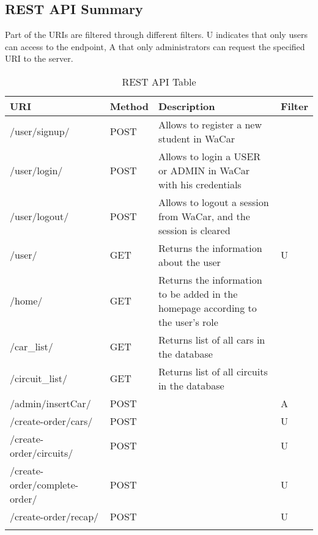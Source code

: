 \subsection{REST API Summary}

Part of the URIs are filtered through different filters. U indicates that only users can access to the endpoint,
A that only administrators can request the specified URI to the server.

\begin{longtable}{|p{}|p{} |p{}|p{}|} 
\hline
\textbf{URI} & \textbf{Method} & \textbf{Description} & \textbf{Filter} \\\hline
/user/signup/  & POST &  Allows to register a new student in WaCar & \\\hline
/user/login/  & POST &  Allows to login a USER or ADMIN in WaCar with his credentials & \\\hline
/user/logout/  & POST &  Allows to logout a session from WaCar, and the session is cleared & \\\hline
/user/ & GET &  Returns the information about the user & U \\\hline
/home/  & GET &  Returns the information to be added in the homepage according to the user's role & \\\hline
/car\_list/  & GET &  Returns list of all cars in the database & \\\hline
/circuit\_list/  & GET &  Returns list of all circuits in the database & \\\hline
/admin/insertCar/ & POST &   & A\\\hline
/create-order/cars/ & POST &   & U\\\hline
/create-order/circuits/ & POST &   & U\\\hline
/create-order/complete-order/ & POST &   & U\\\hline
/create-order/recap/ & POST &   & U\\\hline

\caption{REST API Table}
\label{tab:termGlossary}
\end{longtable}